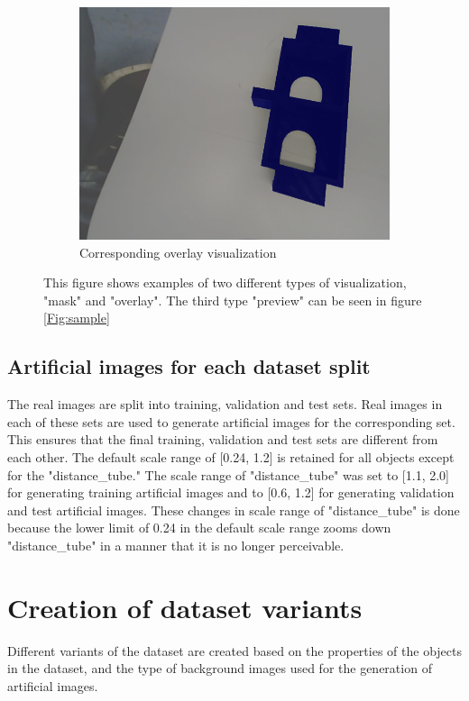\begin{itemize}
\begin{figure}
\begin{subfigure}{.3\textwidth}
  				\includegraphics[width=.9\linewidth]{images/eg_overlay}
  				\caption{Corresponding overlay visualization}
  				\label{Fig:visualsc}
			\end{subfigure}%
		\caption{This figure shows examples of two different types of visualization, "mask" and "overlay". The third type "preview" can be seen in figure \ref{Fig:sample}}
		\label{Fig:visuals}
		\end{figure}
		
	\end{itemize}
	
\subsection{Artificial images for each dataset split}

The real images are split into training, validation and test sets. Real images in each of these sets are used to generate artificial images for the corresponding set. This ensures that the final training, validation and test sets are different from each other. The default scale range of [0.24, 1.2] is retained for all objects except for the "distance\_tube." The scale range of "distance\_tube" was set to [1.1, 2.0] for generating training artificial images and to [0.6, 1.2] for generating validation and test artificial images. These changes in scale range of "distance\_tube" is done because the lower limit of 0.24 in the default scale range zooms down "distance\_tube" in a manner that it is no longer perceivable.

\section{Creation of dataset variants}
Different variants of the dataset are created based on the properties of the objects in the dataset, and the type of background images used for the generation of artificial images.
